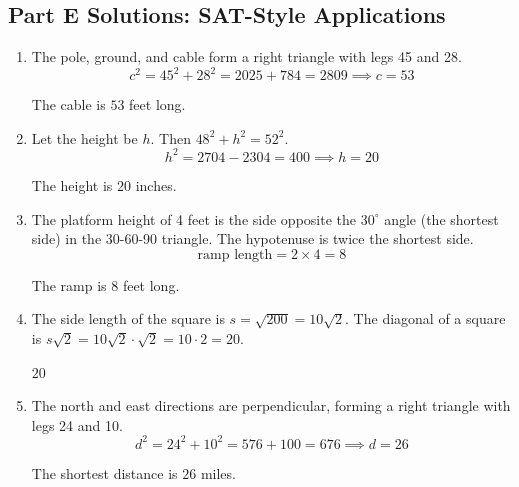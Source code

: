 \documentclass[14pt]{extarticle}
\begin{document}
\subsection*{Part E Solutions: SAT-Style Applications}
\begin{enumerate}
  \item The pole, ground, and cable form a right triangle with legs 45 and 28.
  \[
  c^2 = 45^2 + 28^2 = 2025 + 784 = 2809 \implies c = 53
  \]

  The cable is \(\boxed{53}\) feet long.

  \item Let the height be \(h\). Then \(48^2 + h^2 = 52^2\).
  \[
  h^2 = 2704 - 2304 = 400 \implies h = 20
  \]

  The height is \(\boxed{20}\) inches.

  \item The platform height of 4 feet is the side opposite the \(30^\circ\) angle (the shortest side) in the 30-60-90 triangle. The hypotenuse is twice the shortest side.
  \[
  \text{ramp length} = 2 \times 4 = 8
  \]

  The ramp is \(\boxed{8}\) feet long.

  \item The side length of the square is \(s = \sqrt{200} = 10\sqrt{2}\). The diagonal of a square is \(s\sqrt{2} = 10\sqrt{2} \cdot \sqrt{2} = 10 \cdot 2 = 20\).

  \(\boxed{20}\)

  \item The north and east directions are perpendicular, forming a right triangle with legs 24 and 10.
  \[
  d^2 = 24^2 + 10^2 = 576 + 100 = 676 \implies d = 26
  \]

  The shortest distance is \(\boxed{26}\) miles.
\end{enumerate}

\end{document}
